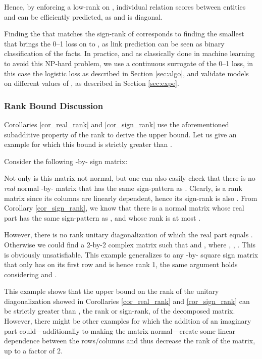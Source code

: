 \documentclass[twoside,11pt]{article}
\begin{document}
Hence, by enforcing a low-rank  on , individual relation scores  between entities  and  can be efficiently predicted, as  and  is diagonal.



Finding the  that matches the sign-rank of 
corresponds to finding the smallest  that brings the 0--1 loss 
on  to ,
as link prediction can be seen as binary classification of the facts.
In practice, and as classically done in machine learning 
to avoid this NP-hard problem,
we use a continuous surrogate of the 0--1 loss, in this case the logistic
loss as described in Section \ref{sec:algo}, and validate
models on different values of , as described in Section
\ref{sec:expe}. 



\subsubsection{Rank Bound Discussion}

Corollaries \ref{cor_real_rank} and \ref{cor_sign_rank} use the aforementioned
subadditive property of the rank to derive the  upper bound.
Let us give an example for which this bound is strictly
greater than .

Consider the following -by- sign matrix:


Not only is this matrix not normal, but one can also easily check that there is no \emph{real} normal -by- matrix that has the same sign-pattern as .
Clearly,  is a rank  matrix since its columns are linearly dependent,
hence its sign-rank is also . From Corollary \ref{cor_sign_rank}, 
we know that there is a normal matrix whose real part has the same sign-pattern as ,
and whose rank is at most . 



However, there is no rank  unitary diagonalization of which the real part equals .
Otherwise we could find a 2-by-2 complex matrix 
such that  and , 
where , ,
. This is obviously unsatisfiable.
This example generalizes to any -by- square sign matrix that only
has  on its first row and is hence rank 1, the same argument holds
considering  and .



This example shows that the upper bound
on the rank of the unitary diagonalization showed in Corollaries \ref{cor_real_rank} 
and \ref{cor_sign_rank} can be strictly greater than , the rank or sign-rank, 
of the decomposed matrix. However, there might be other examples for which the
addition of an imaginary part could---additionally to making the matrix normal---create 
some linear dependence between the rows/columns and thus decrease the rank of the matrix,
up to a factor of 2.\\
\end{document}
